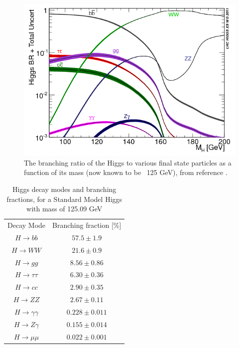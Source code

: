 \begin{figure}
\includegraphics[width=\linewidth]{figures/theory_chapter/HiggsBR.png}
\caption{The branching ratio of the Higgs to various final state particles as a function of its mass (now known to be ~125 GeV), from reference \cite{YellowReport1}.}
\end{figure}

\begin{table}[h]
    \centering
    \begin{tabular}{cc}
        	Decay Mode & Branching fraction [\%] \\
            $H \rightarrow bb $ & $ 57.5 \pm 1.9 $ \\
			$H \rightarrow WW $ & $ 21.6 \pm 0.9 $ \\
			$H \rightarrow gg $ & $ 8.56 \pm 0.86 $ \\
			$H \rightarrow \tau \tau $ & $ 6.30 \pm 0.36 $ \\
			$H \rightarrow cc $ & $ 2.90 \pm 0.35 $ \\
			$H \rightarrow ZZ $ & $ 2.67 \pm 0.11 $ \\
			$H \rightarrow \gamma \gamma $ & $ 0.228 \pm 0.011 $ \\
			$H \rightarrow Z \gamma $ & $ 0.155 \pm 0.014 $ \\
			$H \rightarrow \mu \mu $ & $ 0.022 \pm 0.001 $ \\
    \end{tabular}
    \caption{Higgs decay modes and branching fractions, for a Standard Model Higgs with mass of 125.09 GeV \cite{YellowReport4}}
    \label{mytable}
\end{table}

